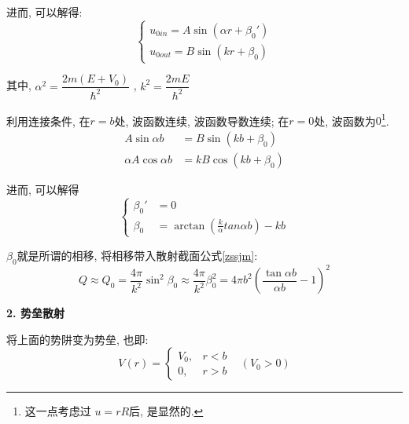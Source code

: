\documentclass[a4paper, 11pt]{article}
\begin{document}
\begin{spacing}{1.2}
          进而, 可以解得:
          \begin{equation}
            \left\{\begin{array}{ll}
              u_{0in} = A\sin(\alpha{}r+\beta_0')\\
              u_{0out} = B\sin(kr+\beta_0)
            \end{array}\right.
          \end{equation}

          其中, $\alpha^2 = \dfrac{2m(E+V_0)}{\hbar^2}$ , $k^2 = \dfrac{2mE}{\hbar^2}$

          利用连接条件, 在$r=b$处, 波函数连续, 波函数导数连续; 在$r=0$处, 波函数为$0$\footnote{这一点考虑过
          $u = rR$后, 是显然的.}. 
          \begin{equation}
            \begin{aligned}
              A\sin\alpha{}b &= B\sin(kb+\beta_0)\\
              \alpha{}A\cos\alpha{}b &= kB\cos(kb+\beta_0)
            \end{aligned}
          \end{equation}

          进而, 可以解得
          \begin{equation}
            \left\{
            \begin{aligned}
              \beta_0' &= 0\\
              \beta_0 &= \arctan\left(\frac{k}{\alpha}tan\alpha{}b\right)-kb
            \end{aligned}\right.
          \end{equation}

          $\beta_0$就是所谓的相移, 将相移带入散射截面公式\eqref{zssjm}:
          \begin{equation}
            Q \approx Q_0 = \dfrac{4\pi}{k^2}\sin^2\beta_0 \approx %
            \dfrac{4\pi}{k^2}\beta_0^2 = 4\pi{}b^2\left(\dfrac{\tan\alpha{}b}{\alpha{}b}-1\right)^2 
          \end{equation}

          \textbf{2. 势垒散射}

          将上面的势阱变为势垒, 也即:
          \begin{equation}
            V(r) = \left\{
              \begin{array}{ll}
                V_0, & r<b\\
                0, & r>b
              \end{array}\right. \;\;\; (V_0>0)
          \end{equation}


\end{spacing}
\end{document}
